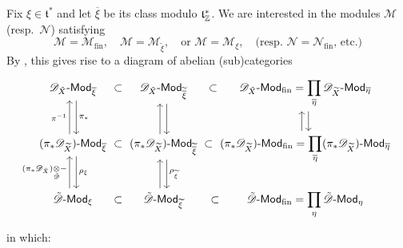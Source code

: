 \documentclass[12pt, a3paper, openany]{book}
\begin{document}
Fix $\xi \in \mathfrak{t}^*$ and let $\overline{\xi}$ be its class modulo $\mathfrak{t}^*_{\mathbb{Z}}$. We are interested in the modules $\mathcal{M}$ (resp.\ $\mathcal{N}$) satisfying
\[ \mathcal{M} = \mathcal{M}_{\mathrm{fin}}, \quad \mathcal{M} = \mathcal{M}_{\tilde{\xi}}, \quad \text{or } \mathcal{M} = \mathcal{M}_{\xi}, \quad \text{(resp.\ $\mathcal{N} = \mathcal{N}_{\mathrm{fin}}$, etc.)} \]
By \cite[2.5.3 and 2.5.4]{BB93}, this gives rise to a diagram of abelian (sub)categories
\begin{equation}\label{eqn:categories} \begin{tikzcd}[column sep=small]
	\mathscr{D}_{\tilde{X}} \dcate{Mod}_{\overline{\xi}} \arrow[phantom, r, sloped, "\subset" description] \arrow[d, xshift=0.3em, "{\pi_*}"] & \mathscr{D}_{\tilde{X}} \dcate{Mod}_{\widetilde{\overline{\xi}}} \arrow[phantom, r, sloped, "\subset" description] \arrow[d, xshift=0.3em] & \mathscr{D}_{\tilde{X}} \dcate{Mod}_{\mathrm{fin}} = \displaystyle\prod_{\overline{\eta}} \mathscr{D}_{\widetilde{X}} \dcate{Mod}_{\overline{\eta}} \arrow[d, xshift=0.3em] \\
	(\pi_* \mathscr{D}_{\widetilde{X}}) \dcate{Mod}_{\overline{\xi}} \arrow[phantom, r, sloped, "\subset" description] \arrow[d, xshift=0.3em, "\rho_{\xi}"] \arrow[u, xshift=-0.3em, "{\pi^{-1}}"] & (\pi_* \mathscr{D}_{\widetilde{X}}) \dcate{Mod}_{\widetilde{\overline{\xi}}} \arrow[phantom, r, sloped, "\subset" description] \arrow[d, xshift=0.3em, "\rho_{\widetilde{\xi}}"] \arrow[u, xshift=-0.3em] & (\pi_* \mathscr{D}_{\widetilde{X}}) \dcate{Mod}_{\mathrm{fin}} = \displaystyle\prod_{\overline{\eta}} (\pi_* \mathscr{D}_{\widetilde{X}}) \dcate{Mod}_{\overline{\eta}} \arrow[u, xshift=-0.3em] \\
	\tilde{\mathscr{D}} \dcate{Mod}_{\xi} \arrow[phantom, r, sloped, "\subset" description] \arrow[u, xshift=-0.3em, "{ (\pi_* \mathscr{D}_{\tilde{X}}) \dotimes{\tilde{\mathscr{D}}} -}"] & \tilde{\mathscr{D}} \dcate{Mod}_{\widetilde{\xi}} \arrow[phantom, r, sloped, "\subset" description] \arrow[u, xshift=-0.3em] & \tilde{\mathscr{D}} \dcate{Mod}_{\mathrm{fin}} = \displaystyle\prod_{\eta} \tilde{\mathscr{D}} \dcate{Mod}_\eta
\end{tikzcd}\end{equation}
in which:
\end{document}
